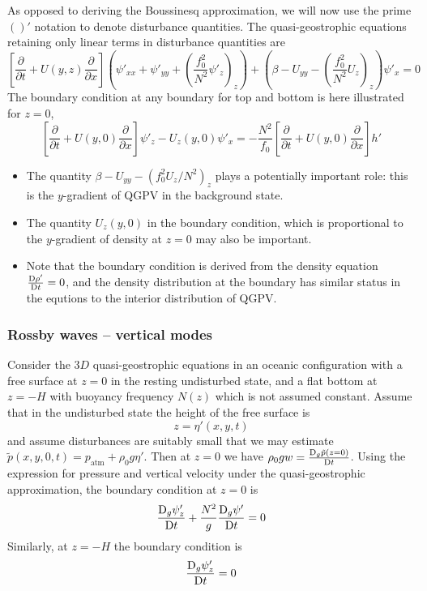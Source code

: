 \documentclass{jknotes}
\begin{document}
As opposed to deriving the Boussinesq approximation, we will now use the prime
$()'$ notation to denote disturbance quantities. The quasi-geostrophic
equations retaining only linear terms in disturbance quantities are
\begin{equation}
	\left[ \frac{\partial}{\partial t} + U(y,z) \frac{\partial}{\partial
	x}\right](\psi'_{xx} + \psi'_{yy} + (\frac{f_0^2}{N^2} \psi'_z)_z) +
	(\beta - U_{yy} - (\frac{f_0^2}{N^2} U_z)_z)\psi'_x = 0 \label{eq:QGPVlin}
\end{equation}
The boundary condition at any boundary for top and bottom is here  illustrated
for $z=0$,
\begin{equation}
	\left[\frac{\partial}{\partial t} + U(y,0) \frac{\partial}{\partial
		x}\right] \psi'_z - U_z(y,0) \psi'_x = -\frac{N^2}{f_0} \left[
			\frac{\partial}{\partial t} + U(y,0) \frac{\partial}{\partial x}
		\right] h'
\end{equation}

\begin{itemize}
	\item The quantity $\beta - U_{yy} - (f_0^2 U_z / N^2)_z$ plays a
		potentially important role: this is the $y$-gradient of QGPV in the
		background state.
	\item The quantity $U_z(y,0)$ in the boundary condition, which is
		proportional to the $y$-gradient of density at $z=0$ may also be
		important.
	\item Note that the boundary condition is derived from the density
		equation $\frac{\mathrm{D} \rho'}{\mathrm{D} t} = 0$, and the density
		distribution at the boundary has similar status in the equtions to the
		interior distribution of QGPV.
\end{itemize}

\subsubsection{Rossby waves -- vertical modes}
Consider the $3D$ quasi-geostrophic equations in an oceanic configuration with
a free surface at $z=0$ in the resting undisturbed state, and a flat bottom at
$z = -H$ with buoyancy frequency $N(z)$ which is not assumed constant. Assume
that in the undisturbed state the height of the free surface is
\begin{equation}
	z = \eta'(x,y,t)
\end{equation}
and assume disturbances are suitably small that we may estimate $\tilde{p}(x,y,0,t) =
p_{\text{atm}} + \rho_0 g \eta'$. Then at $z=0$ we have $\rho_0 g w =
\frac{\mathrm{D}_g \tilde{p}(z=0)}{\mathrm{D} t}$. Using the expression for pressure
and vertical velocity under the quasi-geostrophic approximation, the boundary
condition at $z=0$ is
\begin{equation}
	\frac{\mathrm{D}_g \psi'_z}{\mathrm{D} t} + \frac{N^2}{g} \frac{\mathrm{D}_g
	\psi'}{\mathrm{D} t} = 0
\end{equation}
Similarly, at $z=-H$ the boundary condition is
\begin{equation}
	\frac{\mathrm{D}_g \psi'_z}{\mathrm{D} t} = 0 
\end{equation}
\end{document}
